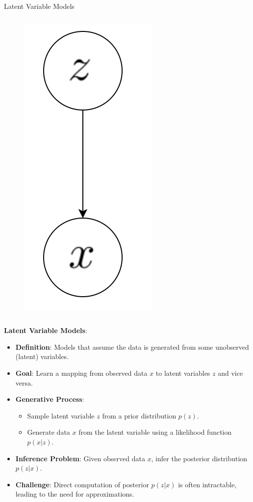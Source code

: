 \begin{frame}[allowframebreaks]{Latent Variable Models}
\begin{columns}
\begin{column}{0.4\linewidth}
\begin{figure}
                \includegraphics[height=0.6\textheight]{images/vae/latent-graph-2.png}
            \end{figure}
        \end{column}
    \end{columns}

\framebreak

\textbf{Latent Variable Models}:
\begin{itemize}
    \item \textbf{Definition}: Models that assume the data is generated from some unobserved (latent) variables.
    \item \textbf{Goal}: Learn a mapping from observed data \( x \) to latent variables \( z \) and vice versa.
    \item \textbf{Generative Process}:
        \begin{itemize}
            \item Sample latent variable \( z \) from a prior distribution \( p(z) \).
            \item Generate data \( x \) from the latent variable using a likelihood function \( p(x|z) \).
        \end{itemize}
    \item \textbf{Inference Problem}: Given observed data \( x \), infer the posterior distribution \( p(z|x) \).
    \item \textbf{Challenge}: Direct computation of posterior \( p(z|x) \) is often intractable, leading to the need for approximations.
\end{itemize}
\end{frame}

